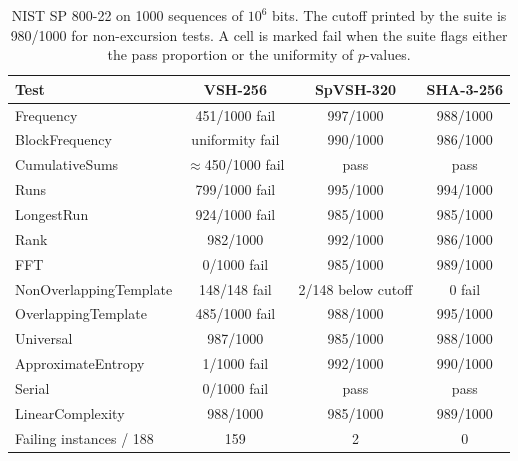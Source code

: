 \begin{table}[ht]
\caption{NIST SP 800-22 on 1000 sequences of \(10^6\) bits. The cutoff printed by the suite is 980/1000 for non-excursion tests. A cell is marked fail when the suite flags either the pass proportion or the uniformity of \(p\)-values.}
\label{tab:nist_sts}
\centering
\small
\begin{tabular}{@{}lccc@{}}
\toprule
Test & VSH-256 & SpVSH-320 & SHA-3-256 \\
\midrule
Frequency & 451/1000 fail & 997/1000 & 988/1000 \\
BlockFrequency & uniformity fail & 990/1000 & 986/1000 \\
CumulativeSums & \(\approx\)450/1000 fail & pass & pass \\
Runs & 799/1000 fail & 995/1000 & 994/1000 \\
LongestRun & 924/1000 fail & 985/1000 & 985/1000 \\
Rank & 982/1000 & 992/1000 & 986/1000 \\
FFT & 0/1000 fail & 985/1000 & 989/1000 \\
NonOverlappingTemplate & 148/148 fail & 2/148 below cutoff & 0 fail \\
OverlappingTemplate & 485/1000 fail & 988/1000 & 995/1000 \\
Universal & 987/1000 & 985/1000 & 988/1000 \\
ApproximateEntropy & 1/1000 fail & 992/1000 & 990/1000 \\
Serial & 0/1000 fail & pass & pass \\
LinearComplexity & 988/1000 & 985/1000 & 989/1000 \\
Failing instances / 188 & 159 & 2 & 0 \\
\bottomrule
\end{tabular}
\end{table}
